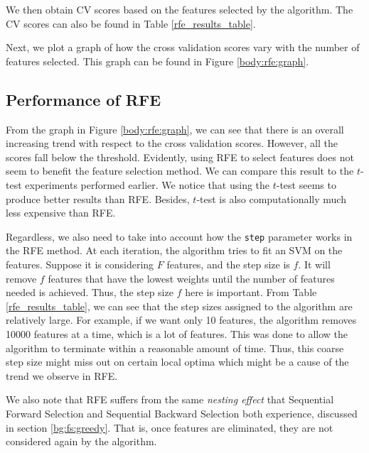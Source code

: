\documentclass[12pt, twoside, a4paper]{report}
\begin{document}

We then obtain CV scores based on the features selected by the algorithm. The CV scores can also be found in Table \ref{rfe_results_table}.

Next, we plot a graph of how the cross validation scores vary with the number of features selected. This graph can be found in Figure \ref{body:rfe:graph}.


\subsection{Performance of RFE}
From the graph in Figure \ref{body:rfe:graph}, we can see that there is an overall increasing trend with respect to the cross validation scores. However, all the scores fall below the threshold. Evidently, using RFE to select features does not seem to benefit the feature selection method. We can compare this result to the $t$-test experiments performed earlier. We notice that using the $t$-test seems to produce better results than RFE. Besides, $t$-test is also computationally much less expensive than RFE.

Regardless, we also need to take into account how the \texttt{step} parameter works in the RFE method. At each iteration, the algorithm tries to fit an SVM on the features. Suppose it is considering $F$ features, and the step size is $f$. It will remove $f$ features that have the lowest weights until the number of features needed is achieved. Thus, the step size $f$ here is important. From Table \ref{rfe_results_table}, we can see that the step sizes assigned to the algorithm are relatively large. For example, if we want only 10 features, the algorithm removes 10000 features at a time, which is a lot of features. This was done to allow the algorithm to terminate within a reasonable amount of time. Thus, this coarse step size might miss out on certain local optima which might be a cause of the trend we observe in RFE.

We also note that RFE suffers from the same \textit{nesting effect} that Sequential Forward Selection and Sequential Backward Selection both experience, discussed in section \ref{bg:fs:greedy}. That is, once features are eliminated, they are not considered again by the algorithm.
\end{document}
